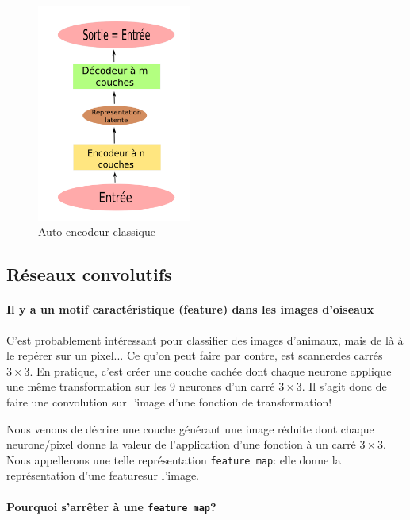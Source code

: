 \documentclass[a4paper, 11pt, onecolumn]{article}
\begin{document}
\begin{figure}
  \includegraphics[width=0.45\textwidth]{Autoencoder}
  \caption{Auto-encodeur classique}
\end{figure}

\subsection{Réseaux convolutifs}

\paragraph{Il y a un motif caractéristique (feature) dans les images d'oiseaux}

C'est probablement intéressant pour classifier des images d'animaux, mais de là
à le repérer sur un pixel... Ce qu'on peut faire par contre, est \og
scanner\fg des carrés $3\times 3$. En pratique, c'est créer une couche cachée
dont chaque neurone applique une même transformation sur les 9 neurones d'un
carré $3\times 3$. Il s'agit donc de faire une convolution sur l'image d'une
fonction de transformation!

Nous venons de décrire une couche générant une image réduite dont chaque
neurone/pixel donne la valeur de l'application d'une fonction à un carré
$3\times 3$. Nous appellerons une telle représentation \texttt{feature map}:
elle donne la représentation d'une \og feature\fg sur l'image.

\paragraph{Pourquoi s'arrêter à une \texttt{feature map}?}
\end{document}

